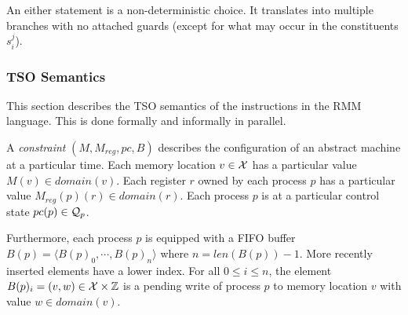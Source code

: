 \documentclass[a4paper]{article}
\begin{document}
An either statement is a non-deterministic choice. It translates into
multiple branches with no attached guards (except for what may occur
in the constituents $s_i^j$).


\begin{center}
\small{
}
\end{center}

\subsubsection{TSO Semantics}

This section describes the TSO semantics of the instructions in the
RMM language. This is done formally and informally in parallel.

\newcommand{\mem}{M}
\newcommand{\regval}{M_{reg}}
\newcommand{\pc}{pc}
\newcommand{\buf}{B}

A \emph{constraint} $(\mem,\regval,\pc,\buf)$ describes the
configuration of an abstract machine at a particular time. Each memory
location $v\in\mathcal{X}$ has a particular value $\mem(v)\in
domain(v)$. Each register $r$ owned by each process $p$ has a
particular value $\regval(p)(r)\in domain(r)$. Each process $p$ is at
a particular control state $\pc(p)\in\pcstates{p}$.

Furthermore, each process $p$ is equipped with a FIFO buffer
\\$\buf(p) = \langle \buf(p)_0, \cdots, \buf(p)_n\rangle$ where $n =
len(\buf(p)) - 1$. More recently inserted elements have a lower
index. For all $0 \leq i \leq n$, the element $\buf(p)_i = (v,w) \in
\vars\times\mathbb{Z}$ is a pending write of process $p$ to memory
location $v$ with value $w\in domain(v)$. 
\end{document}

